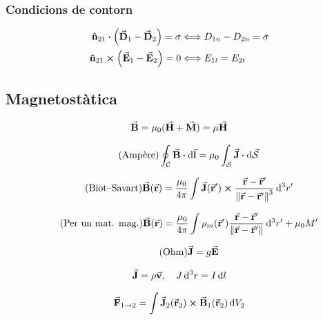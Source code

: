 \subsubsection*{Condicions de contorn}
\begin{align*}
\begin{aligned}
	\vu{n}_{21} \vdot \qty(\va{D}_{1} - \va{D}_{2}) = \sigma &\Longleftrightarrow D_{1n} - D_{2n} = \sigma \\
	\vu{n}_{21} \cross \qty(\va{E}_{1} - \va{E}_{2}) = 0 &\Longleftrightarrow E_{1t} = E_{2t}
\end{aligned}
\end{align*}

\subsection{Magnetostàtica}
\begin{align*}
	\va{B} = \mu_{0} (\va{H} + \va{M}) = \mu \va{H}
\end{align*}

\begin{align}\tag{Ampère}
	\oint_{\mc{C}} \va{B} \vdot \dd{\va{l}} = \mu_{0} \int_{\mc{S}} \va{J} \vdot \dd{\va{\mc{S}}}
\end{align}

\begin{align*}\tag{Biot--Savart}
	\va{B}(\va{r}) = \frac{\mu_{0}}{4\pi} \int \va{J}(\va{r}') \cross \frac{\va{r} - \va{r}'}{\norm{\va{r} - \va{r}'}^{3}} \dd[3]{r'}
\end{align*}

\begin{align*}\tag{Per un mat. mag.}
	\va{B}(\va{r}) = \frac{\mu_{0}}{4\pi} \int \rho_{m}(\va{r}') \frac{\va{r} - \va{r}'}{\norm{\va{r} - \va{r}'}} \dd[3]{r'} + \mu_{0} M'
\end{align*}

\begin{align}\tag{Ohm}
	\va{J} = g \va{E}
\end{align}

\begin{align*}
	\va{J} = \rho \va{v} \qc J\dd[3]{r} = I \dd{l}
\end{align*}

\begin{align*}
	\va{F}_{1 \to 2} = \int \va{J}_{2}(\va{r}_{2}) \cross \va{B}_{1}(\va{r}_{2}) \dd{V_{2}}
\end{align*}

